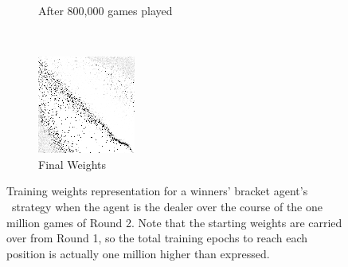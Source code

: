 \begin{figure}
\begin{subfigure}[t]{0.2\textwidth}
	\caption{After 800,000 games played}
	\end{subfigure}
	~
	\begin{subfigure}[t]{0.2\textwidth}
	\includegraphics[width=\textwidth]{images/findings/round2/flipbook/winner/checkpoint_999999.png}
	\caption{Final Weights}
	\end{subfigure}

\caption{
	Training weights representation for a winners' bracket agent's \handmaxavg\
	strategy when the agent is the dealer
	over the course of the one million games of Round 2.
	Note that the starting weights are carried over from Round 1,
	so the total training epochs to reach each position is actually
	one million higher than expressed.
}
\label{fig:r2-flip-winner}
\end{figure}
